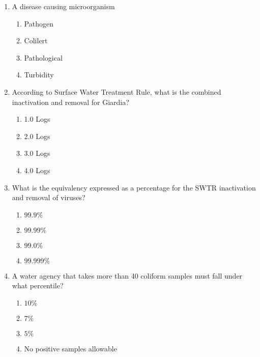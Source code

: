 \documentclass[10pt]{article}
\begin{document}
\begin{enumerate}
\item A disease causing microorganism\\
\begin{enumerate}
\item Pathogen\\
\item Colilert\\
\item Pathological\\
\item Turbidity
\end{enumerate}

\item  According to Surface Water Treatment Rule, what is the combined inactivation and removal for Giardia?\\
\begin{enumerate}
\item 1.0 Logs\\
\item 2.0 Logs\\
\item 3.0 Logs\\
\item 4.0 Logs
\end{enumerate}

\item  What is the equivalency expressed as a percentage for the SWTR inactivation and removal of viruses?\\
\begin{enumerate}
\item $99.9 \%$\\
\item $99.99 \%$\\
\item $99.0 \%$\\
\item $99.999 \%$
\end{enumerate}

\item  A water agency that takes more than 40 coliform samples must fall under what percentile?\\
\begin{enumerate}
\item $10 \%$\\
\item $7 \%$\\
\item $5 \%$\\
\item No positive samples allowable
\end{enumerate}


\end{enumerate}
\end{document}
